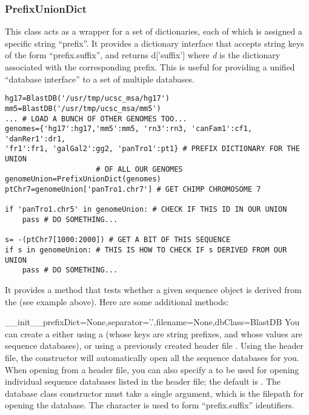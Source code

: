 \documentclass{howto}
\begin{document}
\subsubsection{PrefixUnionDict}
This class acts as a wrapper for a set of dictionaries, each
of which is assigned a specific string ``prefix''.  It provides
a dictionary interface that accepts string keys of the form
``prefix.suffix'', and returns d['suffix'] where {\em d} is
the dictionary associated with the corresponding prefix.  This
is useful for providing a unified ``database interface'' to a
set of multiple databases.
\begin{verbatim}
hg17=BlastDB('/usr/tmp/ucsc_msa/hg17')
mm5=BlastDB('/usr/tmp/ucsc_msa/mm5')
... # LOAD A BUNCH OF OTHER GENOMES TOO...
genomes={'hg17':hg17,'mm5':mm5, 'rn3':rn3, 'canFam1':cf1, 'danRer1':dr1,
'fr1':fr1, 'galGal2':gg2, 'panTro1':pt1} # PREFIX DICTIONARY FOR THE UNION 
					 # OF ALL OUR GENOMES
genomeUnion=PrefixUnionDict(genomes)
ptChr7=genomeUnion['panTro1.chr7'] # GET CHIMP CHROMOSOME 7

if 'panTro1.chr5' in genomeUnion: # CHECK IF THIS ID IN OUR UNION
    pass # DO SOMETHING...

s= -(ptChr7[1000:2000]) # GET A BIT OF THIS SEQUENCE
if s in genomeUnion: # THIS IS HOW TO CHECK IF s DERIVED FROM OUR UNION
    pass # DO SOMETHING... 
\end{verbatim}

It provides a  method that tests whether
a given sequence object is derived from the 
(see example above).  Here are some additional methods:

\begin{funcdesc}{__init__}{prefixDict=None,separator='.',filename=None,dbClass=BlastDB}
  You can create a  either using
  a  (whose keys are string prefixes, and whose 
  values are sequence databases), or using a previously created
  header file .  
  Using the header file, the constructor will
  automatically open all the sequence databases for you.
  When opening from a header file, you can also specify a
   to be used for opening individual sequence databases
  listed in the header file; the default is .
  The database class constructor must take a single argument,
  which is the filepath for opening the database.  The 
   character is used to form ``prefix.suffix''
  identifiers.
\end{funcdesc}
\end{document}
